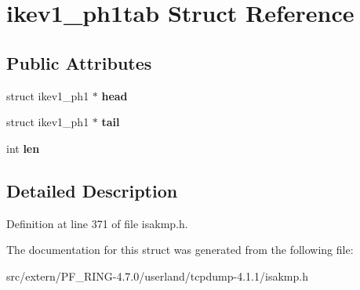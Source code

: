 \hypertarget{structikev1__ph1tab}{
\section{ikev1\_\-ph1tab Struct Reference}
\label{structikev1__ph1tab}
}
\subsection*{Public Attributes}
\begin{DoxyCompactItemize}
\item 
\hypertarget{structikev1__ph1tab_a5ddd1c2385fa9aef9c9fb8cf4a69520c}{
struct ikev1\_\-ph1 $\ast$ {\bfseries head}}
\label{structikev1__ph1tab_a5ddd1c2385fa9aef9c9fb8cf4a69520c}

\item 
\hypertarget{structikev1__ph1tab_ab0909ce570e8118787da637d77ff260c}{
struct ikev1\_\-ph1 $\ast$ {\bfseries tail}}
\label{structikev1__ph1tab_ab0909ce570e8118787da637d77ff260c}

\item 
\hypertarget{structikev1__ph1tab_a2fc6d5410f6f2ed60121e3c439cc0803}{
int {\bfseries len}}
\label{structikev1__ph1tab_a2fc6d5410f6f2ed60121e3c439cc0803}

\end{DoxyCompactItemize}


\subsection{Detailed Description}


Definition at line 371 of file isakmp.h.



The documentation for this struct was generated from the following file:\begin{DoxyCompactItemize}
\item 
src/extern/PF\_\-RING-\/4.7.0/userland/tcpdump-\/4.1.1/isakmp.h\end{DoxyCompactItemize}
